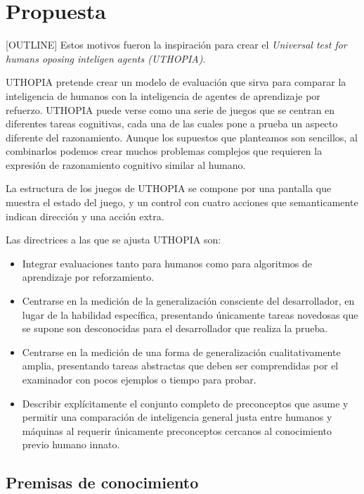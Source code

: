 \chapter{Propuesta}\label{chapter:proposal}

[OUTLINE] Estos motivos fueron la inspiración para crear el \textit{Universal test for humans oposing inteligen agents (UTHOPIA)}.

UTHOPIA pretende crear un modelo de evaluación que sirva para comparar la inteligencia de humanos con la inteligencia de agentes de aprendizaje por refuerzo. UTHOPIA puede verse como una serie de juegos que se centran en diferentes tareas cognitivas, cada una de las cuales pone a prueba un aspecto diferente del razonamiento. Aunque los supuestos que planteamos son sencillos, al combinarlos podemos crear muchos problemas complejos que requieren la expresión de razonamiento cognitivo similar al humano.

La estructura de los juegos de UTHOPIA se compone por una pantalla que muestra el estado del juego, y un control con cuatro acciones que semanticamente indican dirección y una acción extra.

Las directrices a las que se ajusta UTHOPIA son:

\begin{itemize}
    \item Integrar evaluaciones tanto para humanos como para algoritmos de aprendizaje por reforzamiento.
    \item Centrarse en la medición de la generalización consciente del desarrollador, en lugar de la habilidad específica, presentando únicamente tareas novedosas que se supone son desconocidas para el desarrollador que realiza la prueba.
    \item Centrarse en la medición de una forma de generalización cualitativamente amplia, presentando tareas abstractas que deben ser comprendidas por el examinador con pocos ejemplos o tiempo para probar.
    \item Describir explícitamente el conjunto completo de preconceptos que asume y permitir una comparación de inteligencia general justa entre humanos y máquinas al requerir únicamente preconceptos cercanos al conocimiento previo humano innato.
\end{itemize}

\section{Premisas de conocimiento} 

